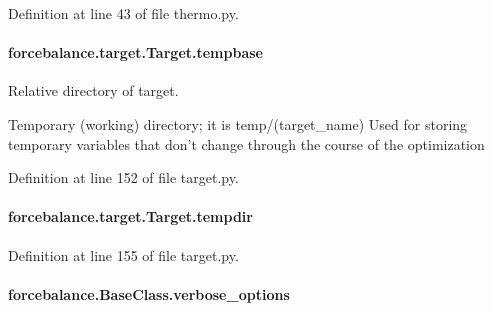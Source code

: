 Definition at line 43 of file thermo.\-py.

\hypertarget{classforcebalance_1_1target_1_1Target_ae5b544d3e11365865813ef3d626ef81d}{
\paragraph[{tempbase}]{\setlength{\rightskip}{0pt plus 5cm}forcebalance.\-target.\-Target.\-tempbase\hspace{0.3cm}{\ttfamily [inherited]}}}\label{classforcebalance_1_1target_1_1Target_ae5b544d3e11365865813ef3d626ef81d}


Relative directory of target. 

Temporary (working) directory; it is temp/(target\-\_\-name) Used for storing temporary variables that don't change through the course of the optimization 

Definition at line 152 of file target.\-py.

\hypertarget{classforcebalance_1_1target_1_1Target_aa1f01b5b78db253b5b66384ed11ed193}{
\paragraph[{tempdir}]{\setlength{\rightskip}{0pt plus 5cm}forcebalance.\-target.\-Target.\-tempdir\hspace{0.3cm}{\ttfamily [inherited]}}}\label{classforcebalance_1_1target_1_1Target_aa1f01b5b78db253b5b66384ed11ed193}


Definition at line 155 of file target.\-py.

\hypertarget{classforcebalance_1_1BaseClass_afd68efa29ccd2f320f4cf82198214aac}{
\paragraph[{verbose\-\_\-options}]{\setlength{\rightskip}{0pt plus 5cm}forcebalance.\-Base\-Class.\-verbose\-\_\-options\hspace{0.3cm}{\ttfamily [inherited]}}}\label{classforcebalance_1_1BaseClass_afd68efa29ccd2f320f4cf82198214aac}


